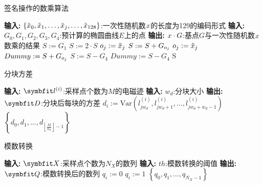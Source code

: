 {	\begin{breakablealgorithm}
		\caption{签名操作的数乘算法}\label{alg:signscalar}
		\begin{algorithmic}[1]
			\Statex \textbf{输入:} $\left\{\tilde{x}_0,\tilde{x}_1,\dots,\tilde{x}_j,\dots, \tilde{x}_{128}\right\}$:一次性随机数$x$的长度为129的编码形式
			\Statex \textbf{输入:} $G_0,G_1,G_2,G_3,G_4$:预计算的椭圆曲线$E$上的点
			\Statex \textbf{输出:} $x\cdot G$:基点$G$与一次性随机数$x$数乘的结果
			\State $S:=G_1$
			\State $S:=2\cdot S$
			\State $o_j:=\tilde {x}_j$
			\State $S:=S+G_{o_j}$
			\Else
			\State $o_j:=\tilde {x}_j$
			\State $Dummy:=S+G_{o_j}$
			\EndIf
			\EndFor
			\State $S:=S-G_4$
			\Else
			\State $Dummy:=S-G_4$
			\EndIf
			\State \Return S
		\end{algorithmic}
	\end{breakablealgorithm}

	\begin{breakablealgorithm}
		\caption{分块方差}\label{alg:calcvar}
		\begin{algorithmic}[1]
			\Statex \textbf{输入:} $\Vector{l}^{(i)}$:采样点个数为$M$的电磁迹
			\Statex \textbf{输入:} $w_d$:分块大小
			\Statex \textbf{输出:} $\Vector D$:分块后每块的方差
			\For {$j:=0\dots\left\lfloor\frac{M}{w_d}\right\rfloor-1$}
			\State $d_i:=\mathrm{Var}(l^{(i)}_{jw_d},l^{(i)}_{jw_d+1},\dots,l^{(i)}_{jw_d+w_d-1})$
			\EndFor
			\State \Return $\left\{d_0,d_1,\dots,d_{\left\lfloor\frac{M}{w_d}\right\rfloor-1}\right\}$
		\end{algorithmic}
	\end{breakablealgorithm}
	
	\begin{breakablealgorithm}
		\caption{模数转换}\label{alg:quantize}
		\begin{algorithmic}[1]
			\Statex \textbf{输入:} $\Vector X$:采样点个数为$N_X$的数列
			\Statex \textbf{输入:} $th$:模数转换的阈值
			\Statex \textbf{输出:} $\Vector Q$:模数转换后的数列
			\For {$i:=0\dots N_X-1$}
			\If{$x_i<th$}
			\State $q_i:=0$
			\Else
			\State $q_i:=1$
			\EndIf
			\EndFor
			\State \Return $\left\{q_0,q_1,\dots,q_{N_X-1}\right\}$
		\end{algorithmic}
	\end{breakablealgorithm}

}

